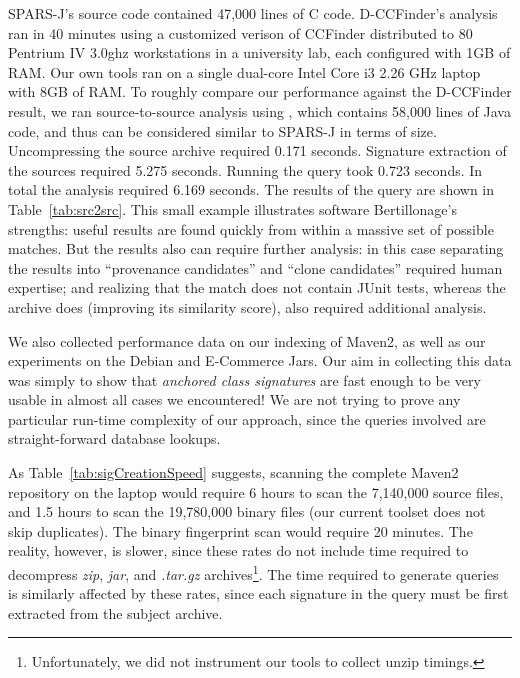 SPARS-J's source code contained 47,000 lines of C code.  D-CCFinder's analysis
ran in 40 minutes using a customized verison of CCFinder distributed to 80 Pentrium IV 3.0ghz workstations
in a university lab, each configured with 1GB of RAM.
Our own tools ran on a single dual-core Intel Core i3 2.26 GHz
laptop with 8GB of RAM.
To roughly compare our performance against the D-CCFinder result, we ran source-to-source
analysis using , which contains 58,000
lines of Java code, and thus can be considered similar to SPARS-J in terms
of size.   Uncompressing the source archive required 0.171 seconds.   Signature extraction of the sources
required 5.275 seconds.  Running the query took 0.723 seconds.  In total the analysis
required 6.169 seconds.  The results of
the query are shown in Table~\ref{tab:src2src}.
This small example illustrates software Bertillonage's strengths:  useful results
are found quickly from within a massive set of possible matches.  But the results also
can require further analysis:  in this case separating the results into ``provenance candidates''
and ``clone candidates'' required human expertise; and realizing that the 
match does not contain JUnit tests, whereas the  archive does (improving its similarity score),
also required additional analysis.

We also collected performance data on our indexing of Maven2, as well as our experiments
on the Debian and E-Commerce Jars.   Our aim in collecting this data was simply
to show that \emph{anchored class signatures} are fast enough to be very usable in almost all cases
we encountered!  We are not trying to prove
any particular run-time complexity of our approach, since the queries involved
are straight-forward database lookups.

As Table~\ref{tab:sigCreationSpeed} suggests, scanning the complete Maven2
repository on the laptop would require 6 hours to scan the 7,140,000 source
files, and 1.5 hours to scan the 19,780,000 binary files (our current
toolset does not skip duplicates).  The binary
fingerprint scan would require 20 minutes.  The reality, however, is
slower, since these rates do not include time required to decompress
\emph{zip}, \emph{jar}, and \emph{.tar.gz} archives\footnote{Unfortunately, we did not instrument our tools to collect unzip timings.}.
The time required to
generate queries is similarly affected by these rates, since each signature
in the query must be first extracted from the subject archive.

